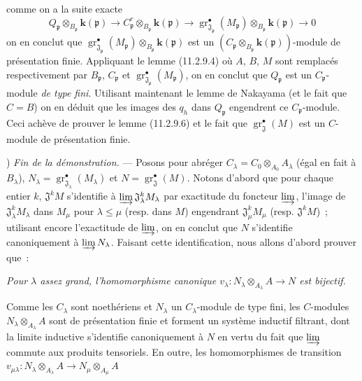 comme on a la suite exacte
\[
Q_\mathfrak p\otimes_{B_\mathfrak p}\boldsymbol{k}(\mathfrak p)
\longrightarrow C_\mathfrak p^{r}\otimes_{B_\mathfrak p}\boldsymbol{k}(\mathfrak p)
\longrightarrow
\operatorname{gr}_{\mathfrak J_\mathfrak p}^\bullet(M_\mathfrak p)
\otimes_{B_\mathfrak p}\boldsymbol{k}(\mathfrak p)\longrightarrow0
\]
on en conclut que
$\operatorname{gr}_{\mathfrak J_\mathfrak p}^\bullet(M_\mathfrak p)
\otimes_{B_\mathfrak p}\boldsymbol{k}(\mathfrak p)$ est un
$(C_\mathfrak p\otimes_{B_\mathfrak p}\boldsymbol{k}(\mathfrak p))$-module de présentation
finie. Appliquant le lemme (11.2.9.4) où $A$, $B$, $M$ sont remplacés
respectivement par $B_\mathfrak p$, $C_\mathfrak p$ et
$\operatorname{gr}_{\mathfrak J_\mathfrak p}^\bullet(M_\mathfrak p)$, on en conclut
que $Q_\mathfrak p$ est un $C_\mathfrak p$-module \emph{de type fini}. Utilisant
maintenant le lemme de Nakayama (et le fait que $C=B$) on en déduit que les
images des $q_h$ dans $Q_\mathfrak p$ engendrent ce $C_\mathfrak p$-module.
Ceci achève de prouver le lemme (11.2.9.6) et le fait que
$\operatorname{gr}_{\mathfrak J}^\bullet(M)$ est un $C$-module de présentation
finie.

\medskip
\noindentVI) \emph{Fin de la démonstration.} --- Posons pour abréger
$C_\lambda=C_0\otimes_{A_0}A_\lambda$ (égal en fait à $B_\lambda$),
$N_\lambda=\operatorname{gr}_{\mathfrak J_\lambda}^\bullet(M_\lambda)$ et
$N=\operatorname{gr}_{\mathfrak J}^\bullet(M)$. Notons d'abord que pour chaque
entier $k$, $\mathfrak J^kM$ s'identifie à
$\varinjlim\mathfrak J_\lambda^kM_\lambda$ par exactitude du foncteur
$\varinjlim$, l'image de $\mathfrak J_\lambda^kM_\lambda$ dans $M_\mu$ pour
$\lambda\leq\mu$ (resp. dans $M$) engendrant $\mathfrak J_\mu^kM_\mu$
(resp. $\mathfrak J^kM$)~; utilisant encore l'exactitude de $\varinjlim$, on
en conclut que $N$ s'identifie canoniquement à $\varinjlim N_\lambda$. Faisant
cette identification, nous allons d'abord prouver que~:

\begin{env}[11.2.9.9]
\label{IV.11.2.9.9-fr}
\emph{Pour $\lambda$ assez grand, l'homomorphisme canonique
$v_\lambda:N_\lambda\otimes_{A_\lambda}A\to N$ est bijectif.}
\end{env}

Comme les $C_\lambda$ sont noethériens et $N_\lambda$ un $C_\lambda$-module
de type fini, les $C$-modules $N_\lambda\otimes_{A_\lambda}A$ sont de
présentation finie et forment un système inductif filtrant, dont la limite
inductive s'identifie canoniquement à $N$ en vertu du fait que $\varinjlim$
commute aux produits tensoriels. En outre, les homomorphismes de transition
$v_{\mu\lambda}:N_\lambda\otimes_{A_\lambda}A
\to N_\mu\otimes_{A_\mu}A$
